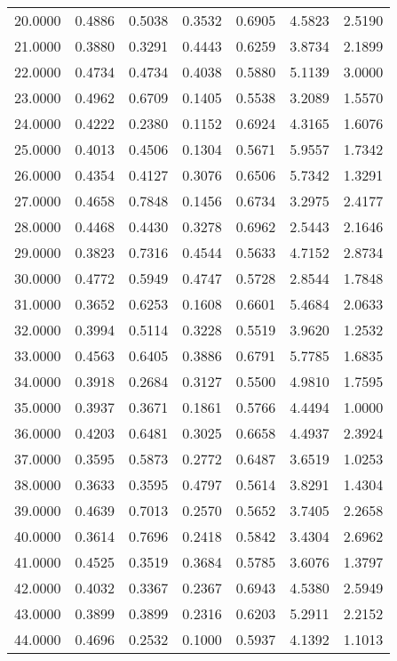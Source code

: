 \begin{longtable}{ p{}  p{}  p{}  p{}  p{} p{}  p{} }
20.0000	&	0.4886	&	0.5038	&	0.3532	&	0.6905	&	4.5823	&	2.5190	\\
21.0000	&	0.3880	&	0.3291	&	0.4443	&	0.6259	&	3.8734	&	2.1899	\\
22.0000	&	0.4734	&	0.4734	&	0.4038	&	0.5880	&	5.1139	&	3.0000	\\
23.0000	&	0.4962	&	0.6709	&	0.1405	&	0.5538	&	3.2089	&	1.5570	\\
24.0000	&	0.4222	&	0.2380	&	0.1152	&	0.6924	&	4.3165	&	1.6076	\\
25.0000	&	0.4013	&	0.4506	&	0.1304	&	0.5671	&	5.9557	&	1.7342	\\
26.0000	&	0.4354	&	0.4127	&	0.3076	&	0.6506	&	5.7342	&	1.3291	\\
27.0000	&	0.4658	&	0.7848	&	0.1456	&	0.6734	&	3.2975	&	2.4177	\\
28.0000	&	0.4468	&	0.4430	&	0.3278	&	0.6962	&	2.5443	&	2.1646	\\
29.0000	&	0.3823	&	0.7316	&	0.4544	&	0.5633	&	4.7152	&	2.8734	\\
30.0000	&	0.4772	&	0.5949	&	0.4747	&	0.5728	&	2.8544	&	1.7848	\\
31.0000	&	0.3652	&	0.6253	&	0.1608	&	0.6601	&	5.4684	&	2.0633	\\
32.0000	&	0.3994	&	0.5114	&	0.3228	&	0.5519	&	3.9620	&	1.2532	\\
33.0000	&	0.4563	&	0.6405	&	0.3886	&	0.6791	&	5.7785	&	1.6835	\\
34.0000	&	0.3918	&	0.2684	&	0.3127	&	0.5500	&	4.9810	&	1.7595	\\
35.0000	&	0.3937	&	0.3671	&	0.1861	&	0.5766	&	4.4494	&	1.0000	\\
36.0000	&	0.4203	&	0.6481	&	0.3025	&	0.6658	&	4.4937	&	2.3924	\\
37.0000	&	0.3595	&	0.5873	&	0.2772	&	0.6487	&	3.6519	&	1.0253	\\
38.0000	&	0.3633	&	0.3595	&	0.4797	&	0.5614	&	3.8291	&	1.4304	\\
39.0000	&	0.4639	&	0.7013	&	0.2570	&	0.5652	&	3.7405	&	2.2658	\\
40.0000	&	0.3614	&	0.7696	&	0.2418	&	0.5842	&	3.4304	&	2.6962	\\
41.0000	&	0.4525	&	0.3519	&	0.3684	&	0.5785	&	3.6076	&	1.3797	\\
42.0000	&	0.4032	&	0.3367	&	0.2367	&	0.6943	&	4.5380	&	2.5949	\\
43.0000	&	0.3899	&	0.3899	&	0.2316	&	0.6203	&	5.2911	&	2.2152	\\
44.0000	&	0.4696	&	0.2532	&	0.1000	&	0.5937	&	4.1392	&	1.1013	\\

\end{longtable}
